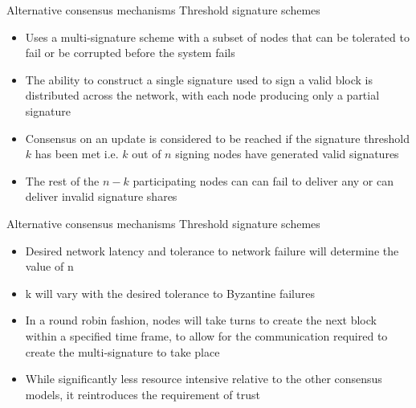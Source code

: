 \documentclass[9pt]{beamer}
\begin{document}

\begin{frame}{Alternative consensus mechanisms}
	Threshold signature schemes
	\begin{itemize}
		\item Uses a multi-signature scheme with a subset of nodes that can be tolerated to fail or be corrupted before the system fails
		\item The ability to construct a single signature used to sign a valid block is distributed across the network, with each node producing only a partial signature
		\item Consensus on an update is considered to be reached if the signature threshold $k$ has been met i.e.  $k$ out of $n$ signing nodes have generated valid signatures
		\item The rest of the $n-k$ participating nodes can can fail to deliver any or can deliver invalid signature shares
	\end{itemize}
\end{frame}


\begin{frame}{Alternative consensus mechanisms}
	Threshold signature schemes
	\begin{itemize}
		\item Desired network latency and tolerance to network failure will determine the value of n
		\item k will vary with the desired tolerance to Byzantine failures
		\item In a round robin fashion, nodes will take turns to create the next block within a specified time frame, to allow for the communication required to create the multi-signature to take place
		\item While significantly less resource intensive relative to the other consensus models, it reintroduces the requirement of trust
	\end{itemize}
\end{frame}

\end{document}
